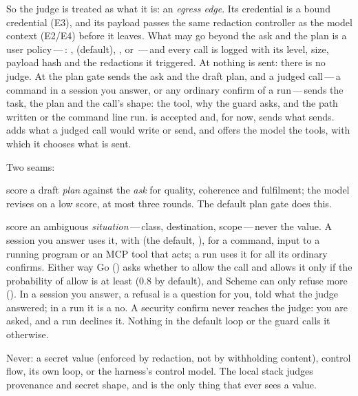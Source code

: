 So the judge is treated as what it is: an \emph{egress edge}. Its credential is a
bound credential (E3), and its payload passes the same redaction controller
as the model context (E2/E4) before it leaves. What may go beyond the ask
and the plan is a user policy\,---\,: ,
 (default), , or \,---\,and every
call is logged with its level, size, payload hash and the redactions it
triggered. At  nothing is sent: there is no judge. At
 the plan gate sends the ask and the draft plan, and a judged
call\,---\,a command in a session you answer, or any ordinary confirm of a
 run\,---\,sends the task, the plan and the call's shape:
the tool, why the guard asks, and the path written or the command line
run.  is accepted and, for now, sends
what  sends.  adds what a judged call would write or
send, and offers the model the  tools, with which it chooses
what is sent.

Two seams:

\begin{description}[leftmargin=1.6em]
\item[Seam A] score a draft \emph{plan} against the \emph{ask} for quality,
  coherence and fulfilment; the model revises on a low score, at most three
  rounds. The default plan gate does this.
\item[Seam C] score an ambiguous \emph{situation}\,---\,class,
  destination, scope\,---\,never the value. A session you answer uses it,
  with  (the default, ), for a
  command, input to a running program or an MCP tool that acts; a
   run uses it for all its ordinary confirms. Either way Go
  () asks  whether to allow
  the call and allows it only if the probability of allow is at least
   (0.8 by default), and Scheme can only
  refuse more (). In a session you answer, a refusal
  is a question for you, told what the judge answered; in a run it is a
  no. A security confirm never reaches the judge: you are asked, and a run
  declines it. Nothing in the default loop or the guard calls it
  otherwise.
\end{description}

Never: a secret value (enforced by redaction, not by withholding content),
control flow, its own loop, or the harness's control model. The local stack
judges provenance and secret shape, and is the only thing that ever sees a
value.

